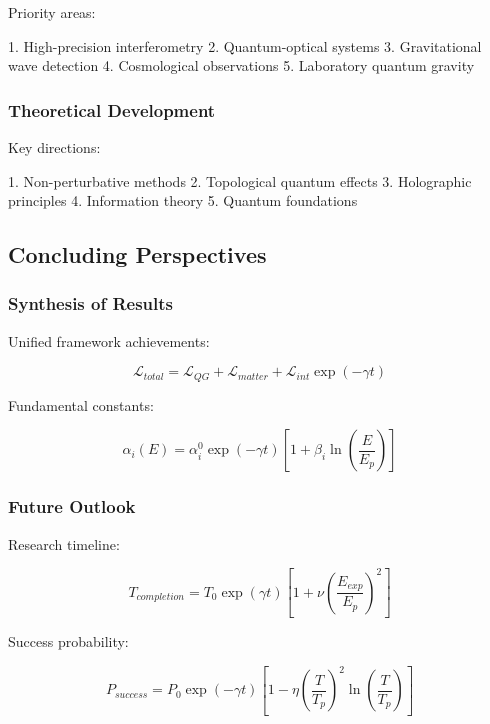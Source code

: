 \documentclass[12pt]{article}
\theoremstyle{plain}
\theoremstyle{definition}
\theoremstyle{remark}
\begin{document}
Priority areas:

1. High-precision interferometry
2. Quantum-optical systems
3. Gravitational wave detection
4. Cosmological observations
5. Laboratory quantum gravity

\subsubsection{Theoretical Development}

Key directions:

1. Non-perturbative methods
2. Topological quantum effects
3. Holographic principles
4. Information theory
5. Quantum foundations

\subsection{Concluding Perspectives}

\subsubsection{Synthesis of Results}

Unified framework achievements:

\begin{equation}
\mathcal{L}_{total} = \mathcal{L}_{QG} + \mathcal{L}_{matter} + \mathcal{L}_{int}\exp(-\gamma t)
\end{equation}

Fundamental constants:

\begin{equation}
\alpha_i(E) = \alpha_i^0\exp(-\gamma t)\left[1 + \beta_i\ln\left(\frac{E}{E_p}\right)\right]
\end{equation}

\subsubsection{Future Outlook}

Research timeline:

\begin{equation}
T_{completion} = T_0\exp(\gamma t)\left[1 + \nu\left(\frac{E_{exp}}{E_p}\right)^2\right]
\end{equation}

Success probability:

\begin{equation}
P_{success} = P_0\exp(-\gamma t)\left[1 - \eta\left(\frac{T}{T_p}\right)^2\ln\left(\frac{T}{T_p}\right)\right]
\end{equation}
\end{document}
